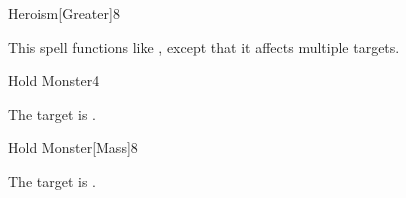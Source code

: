 \begin{spellsection}{Heroism}[Greater]{8}
    \begin{spellheader}
    \end{spellheader}
    \begin{spellcontent}
        \begin{spelltargetinginfo}
        \end{spelltargetinginfo}
        \begin{spelleffects}
            \spellspecial This spell functions like , except that it affects multiple targets.
        \end{spelleffects}
    \end{spellcontent}
    \begin{spellfooter}
        \miscastexplode
    \end{spellfooter}
\end{spellsection}

\begin{spellsection}{Hold Monster}{4}
    \begin{spellheader}
    \end{spellheader}
    \begin{spellcontent}
        \begin{spelltargetinginfo}
        \end{spelltargetinginfo}
        \begin{spelleffects}
            \spelleffect The target is \immobilized.
            \spelldur \durshort
        \end{spelleffects}
    \end{spellcontent}
    \begin{spellfooter}
        \miscastrandom
    \end{spellfooter}
\end{spellsection}

\begin{spellsection}{Hold Monster}[Mass]{8}
    \begin{spellheader}
    \end{spellheader}
    \begin{spellcontent}
        \begin{spelltargetinginfo}
        \end{spelltargetinginfo}
        \begin{spelleffects}
            \spelleffect The target is \immobilized.
            \spelldur \durshort
        \end{spelleffects}
    \end{spellcontent}
    \begin{spellfooter}
        \miscastexplode
    \end{spellfooter}
\end{spellsection}


